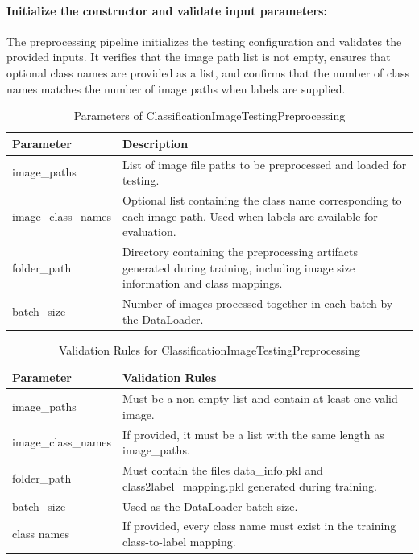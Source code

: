 \paragraph{Initialize the constructor and validate input parameters:}\par
The preprocessing pipeline initializes the testing configuration and validates the provided inputs. It verifies that the image path list is not empty, ensures that optional class names are provided as a list, and confirms that the number of class names matches the number of image paths when labels are supplied.
\begin{table}[H]
\centering
\begin{tabular}{|l|p{9cm}|}
\hline
\textbf{Parameter} & \textbf{Description} \\
\hline
image\_paths & List of image file paths to be preprocessed and loaded for testing. \\
\hline
image\_class\_names & Optional list containing the class name corresponding to each image path. Used when labels are available for evaluation. \\
\hline
folder\_path & Directory containing the preprocessing artifacts generated during training, including image size information and class mappings. \\
\hline
batch\_size & Number of images processed together in each batch by the DataLoader. \\
\hline
\end{tabular}
\caption{Parameters of ClassificationImageTestingPreprocessing}
\label{tab:image_testing_parameters}
\end{table}
\begin{table}[H]
\centering
\begin{tabular}{|l|p{9cm}|}
\hline
\textbf{Parameter} & \textbf{Validation Rules} \\
\hline
image\_paths & Must be a non-empty list and contain at least one valid image. \\
\hline
image\_class\_names & If provided, it must be a list with the same length as image\_paths. \\
\hline
folder\_path & Must contain the files data\_info.pkl and class2label\_mapping.pkl generated during training. \\
\hline
batch\_size & Used as the DataLoader batch size. \\
\hline
class names & If provided, every class name must exist in the training class-to-label mapping. \\
\hline
\end{tabular}
\caption{Validation Rules for ClassificationImageTestingPreprocessing}
\label{tab:image_testing_validation}
\end{table}
\vspace{1cm}

